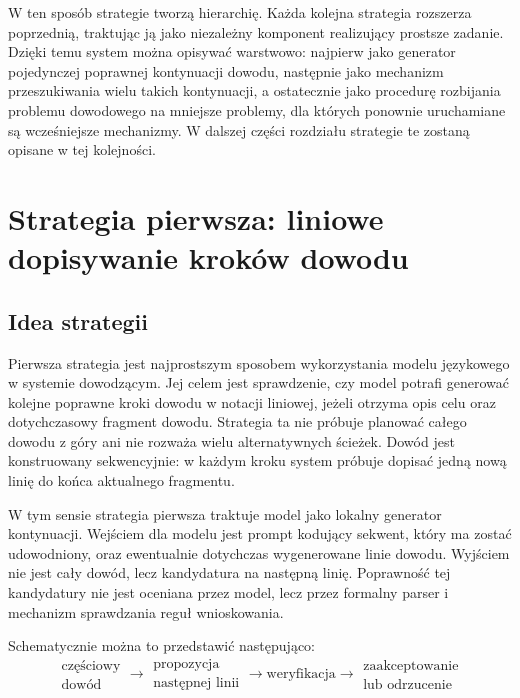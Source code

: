 \documentclass[shortabstract]{iithesis}
\theoremstyle{definition}
\theoremstyle{remark}
\theoremstyle{plain}
\begin{document}
W ten sposób strategie tworzą hierarchię. Każda kolejna strategia rozszerza
poprzednią, traktując ją jako niezależny komponent realizujący prostsze zadanie. Dzięki
temu system można opisywać warstwowo: najpierw jako generator pojedynczej
poprawnej kontynuacji dowodu, następnie jako mechanizm przeszukiwania wielu
takich kontynuacji, a ostatecznie jako procedurę rozbijania problemu dowodowego
na mniejsze problemy, dla których ponownie uruchamiane są wcześniejsze mechanizmy.
W dalszej części rozdziału strategie te zostaną opisane w tej kolejności.



\section{Strategia pierwsza: liniowe dopisywanie kroków dowodu}

\subsection{Idea strategii}

Pierwsza strategia jest najprostszym sposobem wykorzystania modelu językowego
w systemie dowodzącym. Jej celem jest sprawdzenie, czy model potrafi generować
kolejne poprawne kroki dowodu w notacji liniowej, jeżeli otrzyma opis celu oraz
dotychczasowy fragment dowodu. Strategia ta nie próbuje planować całego dowodu
z góry ani nie rozważa wielu alternatywnych ścieżek. Dowód jest konstruowany
sekwencyjnie: w każdym kroku system próbuje dopisać jedną nową linię do końca
aktualnego fragmentu.

W tym sensie strategia pierwsza traktuje model jako lokalny generator kontynuacji.
Wejściem dla modelu jest prompt kodujący sekwent, który ma zostać udowodniony,
oraz ewentualnie dotychczas wygenerowane linie dowodu. Wyjściem nie jest cały
dowód, lecz kandydatura na następną linię. Poprawność tej kandydatury nie jest
oceniana przez model, lecz przez formalny parser i mechanizm sprawdzania reguł
wnioskowania.

Schematycznie można to przedstawić następująco:
\[
\begin{array}{c}
\text{częściowy}\\
\text{dowód}
\end{array}
\longrightarrow
\begin{array}{c}
\text{propozycja}\\
\text{następnej linii}
\end{array}
\longrightarrow
\text{weryfikacja}
\longrightarrow
\begin{array}{c}
\text{zaakceptowanie}\\
\text{lub odrzucenie}
\end{array}
\]
\end{document}
